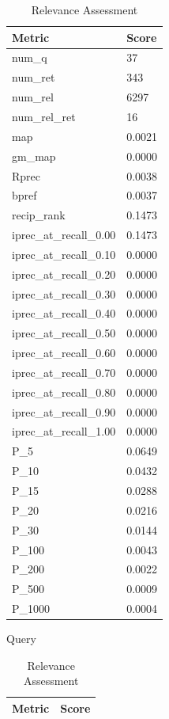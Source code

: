 \begin{table}[htb]
    \parbox{.45\linewidth}{
    \begin{tabular}{ | l | l | }
    \hline
    Metric & Score \\ \hline
	num\_q & 37 \\ \hline
	num\_ret & 343 \\ \hline
	num\_rel & 6297 \\ \hline
	num\_rel\_ret & 16 \\ \hline
	map & 0.0021 \\ \hline
	gm\_map & 0.0000 \\ \hline
	Rprec & 0.0038 \\ \hline
	bpref & 0.0037 \\ \hline
	recip\_rank & 0.1473 \\ \hline
	iprec\_at\_recall\_0.00 & 0.1473 \\ \hline
	iprec\_at\_recall\_0.10 & 0.0000 \\ \hline
	iprec\_at\_recall\_0.20 & 0.0000 \\ \hline
	iprec\_at\_recall\_0.30 & 0.0000 \\ \hline
	iprec\_at\_recall\_0.40 & 0.0000 \\ \hline
	iprec\_at\_recall\_0.50 & 0.0000 \\ \hline
	iprec\_at\_recall\_0.60 & 0.0000 \\ \hline
	iprec\_at\_recall\_0.70 & 0.0000 \\ \hline
	iprec\_at\_recall\_0.80 & 0.0000 \\ \hline
	iprec\_at\_recall\_0.90 & 0.0000 \\ \hline
	iprec\_at\_recall\_1.00 & 0.0000 \\ \hline
	P\_5 & 0.0649 \\ \hline
	P\_10 & 0.0432 \\ \hline
	P\_15 & 0.0288 \\ \hline
	P\_20 & 0.0216 \\ \hline
	P\_30 & 0.0144 \\ \hline
	P\_100 & 0.0043 \\ \hline
	P\_200 & 0.0022 \\ \hline
	P\_500 & 0.0009 \\ \hline
	P\_1000 & 0.0004 \\ \hline
    \end{tabular}
    \caption{Query}
    }
    \parbox{.45\linewidth}{
    \begin{tabular}{ | l | l | }
    \hline
    Metric & Score \\ \hline

    \end{tabular}
    \caption{Relevance Assessment}
    }
\end{table}

